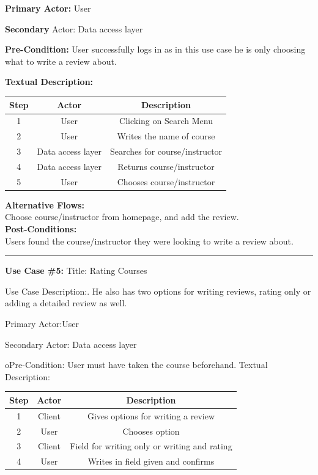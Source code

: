 \documentclass{article}
\begin{document}
\quad\textbf{Primary Actor:} User

\quad\textbf{Secondary} Actor: Data access layer

\quad\textbf{Pre-Condition: }
User successfully logs in as in this use case he is only choosing what to write a review about.

\quad\textbf{Textual Description:}


\begin{center}
  \begin{tabular}{|c|c|c|} 
    \hline
    Step &
    Actor&
Description \\ \hline
    1 &
    User &
Clicking on Search Menu \\
    2 &
    User &
Writes the name of course \\
    3 &
    Data access layer &
Searches for course/instructor \\
    4 &
    Data access layer &
Returns course/instructor \\
    5 &
    User &
Chooses course/instructor \\ \hline

\end{tabular}
\end{center}

\textbf{Alternative Flows:}\\
	Choose course/instructor from homepage, and add the review.\\
  \textbf{Post-Conditions:}\\
Users found the course/instructor they were looking to write a review about. \\


\hrule 



\textbf{Use Case \#5: }
	Title: Rating Courses

Use Case Description:. He also has two options for writing reviews, rating only or adding a detailed review as well. 

	Primary Actor:User

	Secondary Actor: Data access layer

	oPre-Condition: User must have taken the course beforehand.
	Textual Description:



\begin{center}
  \begin{tabular}{|c|c|c|}
\hline
Step &
Actor &
Description\\ \hline
1 &
Client &
Gives options for writing a review \\

2 &

User & 
Chooses option  \\
3& 
Client &
Field for writing only or writing and rating  \\
4& 
User &
Writes in field given and confirms \\ \hline

\end{tabular}
\end{center}
\end{document}
